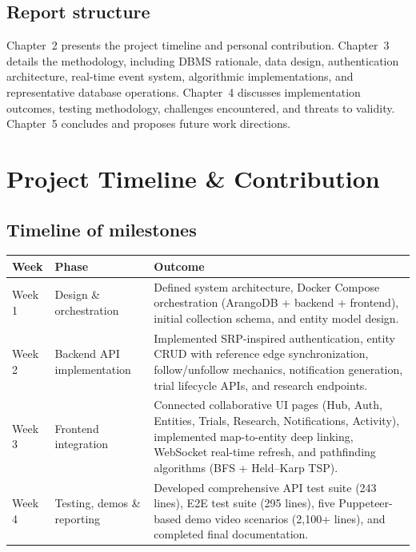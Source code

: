 \documentclass[13pt,a4paper]{report}
\begin{document}
\section{Report structure}
Chapter~2 presents the project timeline and personal contribution. Chapter~3 details the methodology, including DBMS rationale, data design, authentication architecture, real-time event system, algorithmic implementations, and representative database operations. Chapter~4 discusses implementation outcomes, testing methodology, challenges encountered, and threats to validity. Chapter~5 concludes and proposes future work directions.

\chapter{Project Timeline \& Contribution}
\section{Timeline of milestones}
\begin{longtable}{p{2.8cm}p{4.6cm}p{7.2cm}}
\toprule
\textbf{Week} & \textbf{Phase} & \textbf{Outcome} \\
\midrule
Week 1 & Design \& orchestration & Defined system architecture, Docker Compose orchestration (ArangoDB + backend + frontend), initial collection schema, and entity model design. \\
\midrule
Week 2 & Backend API implementation & Implemented SRP-inspired authentication, entity CRUD with reference edge synchronization, follow/unfollow mechanics, notification generation, trial lifecycle APIs, and research endpoints. \\
\midrule
Week 3 & Frontend integration & Connected collaborative UI pages (Hub, Auth, Entities, Trials, Research, Notifications, Activity), implemented map-to-entity deep linking, WebSocket real-time refresh, and pathfinding algorithms (BFS + Held--Karp TSP). \\
\midrule
Week 4 & Testing, demos \& reporting & Developed comprehensive API test suite (243 lines), E2E test suite (295 lines), five Puppeteer-based demo video scenarios (2{,}100+ lines), and completed final documentation. \\
\bottomrule
\end{longtable}
\end{document}
